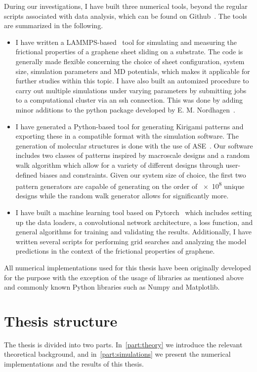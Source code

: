 During our investigations, I have built three numerical tools, beyond the regular scripts associated with data analysis, which can be found on Github~\cite{Github}. The tools are summarized in the following. 
\begin{itemize}
    \item I have written a LAMMPS-based~\cite{LAMMPS} tool for simulating and measuring the frictional properties of a graphene sheet sliding on a substrate. The code is generally made flexible concerning the choice of sheet configuration, system size, simulation parameters and \acrshort{MD} potentials, which makes it applicable for further studies within this topic. I have also built an automized procedure to carry out multiple simulations under varying parameters by submitting jobs to a computational cluster via an ssh connection. This was done by adding minor additions to the python package developed by E. M. Nordhagen~\cite{lammps_simulator}.
    \item I have generated a Python-based tool for generating Kirigami patterns and exporting these in a compatible format with the simulation software. The generation of molecular structures is done with the use of ASE~\cite{ase-paper}. Our software includes two classes of patterns inspired by macroscale designs and a random walk algorithm which allow for a variety of different designs through user-defined biases and constraints. Given our system size of choice, the first two pattern generators are capable of generating on the order of \num{e8} unique designs while the random walk generator allows for significantly more. 
    \item I have built a machine learning tool based on Pytorch~\cite{NEURIPS2019_9015} which includes setting up the data loaders, a convolutional network architecture, a loss function, and general algorithms for training and validating the results. Additionally, I have written several scripts for performing grid searches and analyzing the model predictions in the context of the frictional properties of graphene. 
\end{itemize}
All numerical implementations used for this thesis have been originally developed for the purpose with the exception of the usage of libraries as mentioned above and commonly known Python libraries such as Numpy and Matplotlib.

\section{Thesis structure}
The thesis is divided into two parts. In~\cref{part:theory} we introduce the
relevant theoretical background, and in~\cref{part:simulations} we present the
numerical implementations and the results of this thesis.

